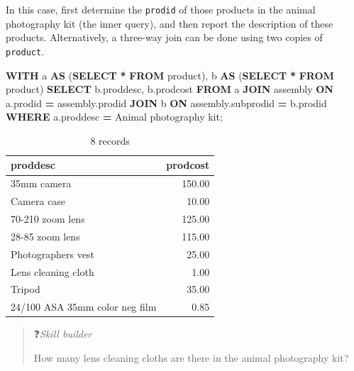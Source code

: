 \documentclass[
]{article}
\newenvironment{Shaded}{\begin{snugshade}}{\end{snugshade}}
\newcommand{\KeywordTok}[1]{\textcolor[rgb]{0.13,0.29,0.53}{\textbf{#1}}}
\newcommand{\NormalTok}[1]{#1}
\newcommand{\OperatorTok}[1]{\textcolor[rgb]{0.81,0.36,0.00}{\textbf{#1}}}
\newcommand{\StringTok}[1]{\textcolor[rgb]{0.31,0.60,0.02}{#1}}
\begin{document}
In this case, first determine the \texttt{prodid} of those products in the
animal photography kit (the inner query), and then report the
description of these products. Alternatively, a three-way join can be
done using two copies of \texttt{product}.

\begin{Shaded}
\begin{Highlighting}[]
\KeywordTok{WITH}
\NormalTok{a }\KeywordTok{AS}\NormalTok{ (}\KeywordTok{SELECT} \OperatorTok{*} \KeywordTok{FROM}\NormalTok{ product), }
\NormalTok{b }\KeywordTok{AS}\NormalTok{ (}\KeywordTok{SELECT} \OperatorTok{*} \KeywordTok{FROM}\NormalTok{ product) }
\KeywordTok{SELECT}\NormalTok{ b.proddesc, b.prodcost }\KeywordTok{FROM}\NormalTok{ a }\KeywordTok{JOIN}\NormalTok{ assembly}
        \KeywordTok{ON}\NormalTok{ a.prodid }\OperatorTok{=}\NormalTok{ assembly.prodid}
        \KeywordTok{JOIN}\NormalTok{ b}
        \KeywordTok{ON}\NormalTok{ assembly.subprodid }\OperatorTok{=}\NormalTok{ b.prodid}
        \KeywordTok{WHERE}\NormalTok{ a.proddesc }\OperatorTok{=} \StringTok{\textquotesingle{}Animal photography kit\textquotesingle{}}\NormalTok{;}
\end{Highlighting}
\end{Shaded}

\begin{table}

\caption{\label{tab:unnamed-chunk-90}8 records}
\centering
\begin{tabular}[t]{l|r}
\hline
proddesc & prodcost\\
\hline
35mm camera & 150.00\\
\hline
Camera case & 10.00\\
\hline
70-210 zoom lens & 125.00\\
\hline
28-85 zoom lens & 115.00\\
\hline
Photographers vest & 25.00\\
\hline
Lens cleaning cloth & 1.00\\
\hline
Tripod & 35.00\\
\hline
24/100 ASA 35mm color neg film & 0.85\\
\hline
\end{tabular}
\end{table}

\begin{quote}
❓\emph{Skill builder}

How many lens cleaning cloths are there in the animal photography kit?
\end{quote}
\end{document}
